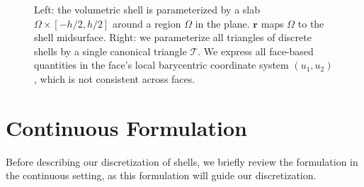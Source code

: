 \documentclass[timestamp,acmtog]{acmart}
\newcommand{\br}{\mathbf{r}}
\newcommand{\bff}{\mathbf{f}}
\newcommand{\hn}{\hat{\mathbf{n}}}
\begin{document}
\begin{figure}
\caption{Left: the volumetric shell is parameterized by a slab $\Omega \times [-h/2,h/2]$ around a region $\Omega$ in the plane. $\br$ maps $\Omega$ to the shell midsurface. Right: we parameterize all triangles of discrete shells by a single canonical triangle $\mathcal{T}$. We express all face-based quantities in the face's local barycentric coordinate system $(u_1,u_2)$, which is not consistent across faces.}
\label{fig:technical}
\end{figure}
\section{Continuous Formulation} \label{sec:continuous}
Before describing our discretization of shells, we briefly review the formulation in the continuous setting, as this formulation will guide our discretization. 
\end{document}
